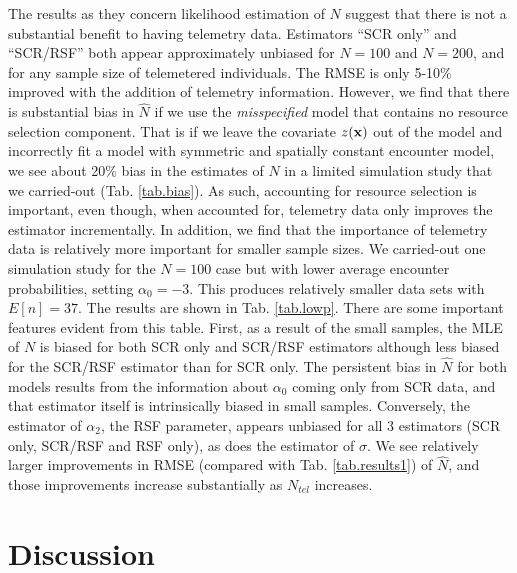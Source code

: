 \documentclass[12pt]{article}
\begin{document}
The results as they concern likelihood estimation of $N$ suggest that
there is not a substantial benefit to having telemetry
data. Estimators ``SCR only'' and ``SCR/RSF'' both appear
approximately unbiased for $N=100$ and $N=200$, and for any sample
size of telemetered individuals. The RMSE is only 5-10\% improved with
the addition of telemetry information.  However, we find that there is
substantial bias in $\hat{N}$ if we use the {\it misspecified} model
that contains no resource selection component. That is if we leave the
covariate $z({\bf x})$ out of the model and incorrectly fit a model
with symmetric and spatially constant encounter model, we see about
20\% bias in the estimates of $N$ in a limited simulation study that
we carried-out (Tab. \ref{tab.bias}). As such, accounting for resource
selection is important, even though, when accounted for, telemetry
data only improves the estimator incrementally.
In addition, we find that the importance of telemetry data is
relatively more important for smaller sample sizes. We carried-out one
simulation study for the $N=100$ case but with lower average encounter
probabilities, setting $\alpha_{0}=-3$. This produces
relatively smaller data sets with  $E[n] = 37$. The results are shown
in Tab. \ref{tab.lowp}. There are some important features evident from
this table. First, as a result of the small samples, the MLE of $N$ is
biased for both SCR only and SCR/RSF estimators although less biased
for the SCR/RSF estimator than for SCR only. The persistent bias in
$\hat{N}$ for both models results from the information about
$\alpha_{0}$ coming only from SCR data, and that estimator itself is
intrinsically biased in small samples.  Conversely, the estimator of
$\alpha_{2}$, the RSF parameter, appears unbiased for all 3 estimators
(SCR only, SCR/RSF and RSF only), as does the estimator of $\sigma$.
We see relatively larger improvements in RMSE (compared with Tab. \ref{tab.results1}) of $\hat{N}$, and those improvements
increase substantially as $N_{tel}$ increases.









\section{Discussion}
\end{document}
